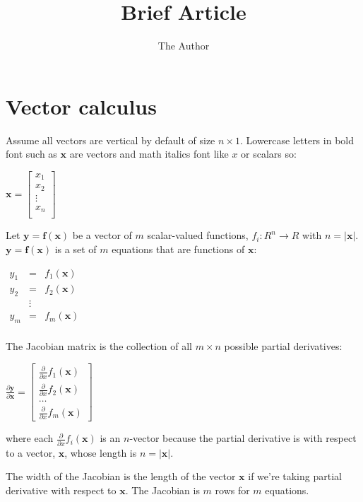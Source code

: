 \documentclass[11pt]{article}
\title{Brief Article}
\author{The Author}
\begin{document}
\maketitle

\section{Vector calculus}

Assume all vectors are vertical by default of size $n \times 1$. Lowercase letters in bold font such as $\mathbf{x}$ are vectors and math italics font like $x$ or scalars so:

$\mathbf{x} = \begin{bmatrix}
           x_1\\
           x_2\\
           \vdots \\
           x_n\\
           \end{bmatrix}$

Let $\mathbf{y} = \mathbf{f}(\mathbf{x})$ be a vector of $m$ scalar-valued functions, $f_i : R^n \rightarrow R$ with $n=|\mathbf{x}|$. $\mathbf{y} = \mathbf{f}(\mathbf{x})$ is a set of $m$ equations that are functions of $\mathbf{x}$:

$
\begin{array}{lcl}
y_1 & = & f_1(\mathbf{x})\\
y_2 & = & f_2(\mathbf{x})\\
 & \vdots & \\
y_m & = & f_m(\mathbf{x})\\
\end{array}
$

The Jacobian matrix is the collection of all $m \times n$ possible partial derivatives:

$
\frac{\partial \mathbf{y}}{\partial \mathbf{x}} = \begin{bmatrix}
\frac{\partial}{\partial {x}} f_1(\mathbf{x}) \\
\frac{\partial}{\partial {x}} f_2(\mathbf{x})\\
\ldots\\
\frac{\partial}{\partial {x}} f_m(\mathbf{x})
\end{bmatrix}
$

where each $\frac{\partial}{\partial {x}} f_i(\mathbf{x})$ is an $n$-vector because the partial derivative is with respect to a vector, $\mathbf{x}$, whose length is $n = |\mathbf{x}|$.

The width of the Jacobian is the length of the vector $\mathbf{x}$ if we're taking partial derivative with respect to $\mathbf{x}$.  The Jacobian is $m$ rows for $m$ equations.
\end{document}
